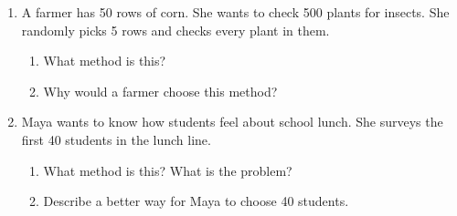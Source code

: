 \documentclass[11pt]{article}
\begin{document}
\begin{enumerate}
\begin{enumerate}[itemsep=1em]
  \work{3em}
  \item Why might a stratified sample be better than an SRS here?

\end{enumerate}
\work{3em}

\item A farmer has 50 rows of corn. She wants to check 500 plants for insects. She randomly picks 5 rows and checks every plant in them.
\begin{enumerate}[itemsep=1em]
  \item What method is this? 
  \item Why would a farmer choose this method?

\end{enumerate}
\work{2.5em}

\item Maya wants to know how students feel about school lunch. She surveys the first 40 students in the lunch line.
\begin{enumerate}[itemsep=1em]
  \item What method is this? What is the problem?

  \work{2.5em}
  \item Describe a better way for Maya to choose 40 students.

\end{enumerate}

\end{enumerate}
\end{document}
